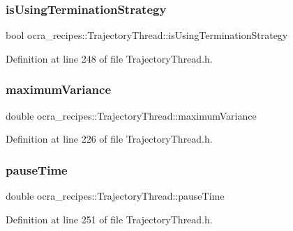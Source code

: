 \subsubsection{\texorpdfstring{is\+Using\+Termination\+Strategy}{isUsingTerminationStrategy}}
{\footnotesize\ttfamily bool ocra\+\_\+recipes\+::\+Trajectory\+Thread\+::is\+Using\+Termination\+Strategy\hspace{0.3cm}{\ttfamily [protected]}}



Definition at line 248 of file Trajectory\+Thread.\+h.

\hypertarget{classocra__recipes_1_1TrajectoryThread_a16c8d8bfbbfb45b1a3fa9b08781123aa}{}\label{classocra__recipes_1_1TrajectoryThread_a16c8d8bfbbfb45b1a3fa9b08781123aa} 
\subsubsection{\texorpdfstring{maximum\+Variance}{maximumVariance}}
{\footnotesize\ttfamily double ocra\+\_\+recipes\+::\+Trajectory\+Thread\+::maximum\+Variance\hspace{0.3cm}{\ttfamily [protected]}}



Definition at line 226 of file Trajectory\+Thread.\+h.

\hypertarget{classocra__recipes_1_1TrajectoryThread_a9436d523ebb66dfa9bbc8ed458306e46}{}\label{classocra__recipes_1_1TrajectoryThread_a9436d523ebb66dfa9bbc8ed458306e46} 
\subsubsection{\texorpdfstring{pause\+Time}{pauseTime}}
{\footnotesize\ttfamily double ocra\+\_\+recipes\+::\+Trajectory\+Thread\+::pause\+Time\hspace{0.3cm}{\ttfamily [protected]}}



Definition at line 251 of file Trajectory\+Thread.\+h.


